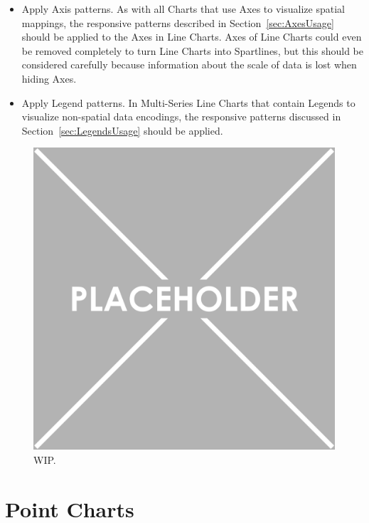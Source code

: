 \begin{itemize}
\item
Apply Axis patterns.
As with all Charts that use Axes to visualize spatial mappings, the responsive patterns described in Section~\ref{sec:AxesUsage} should be applied to the Axes in Line Charts.
Axes of Line Charts could even be removed completely to turn Line Charts into Spartlines, but this should be considered carefully because information about the scale of data is lost when hiding Axes.

\item
Apply Legend patterns.
In Multi-Series Line Charts that contain Legends to visualize non-spatial data encodings, the responsive patterns discussed in Section~\ref{sec:LegendsUsage} should be applied.

\end{itemize}


\begin{samepage}
%
    WIP
  },
]{listings/line-chart-patterns.html}
\end{samepage}

\begin{figure}[tp]
\centering
\includegraphics[keepaspectratio,width=\linewidth,height=\fullh]{images/placeholder.png}
\caption[Results of Responsive Patterns Targeting Line Charts]{
  WIP.
}
\label{fig:LineChartPatterns}
\end{figure}

\section{Point Charts}
\label{sec:PointChartsUsage}
